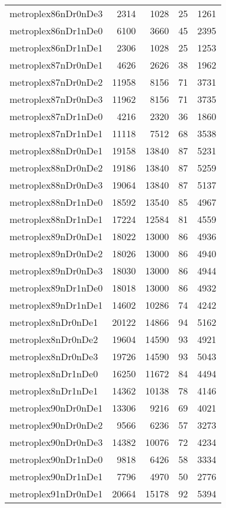 \begin{tabular}{lrrrr}
metroplex86nDr0nDe3 & 2314 & 1028 & 25 & 1261 \\
metroplex86nDr1nDe0 & 6100 & 3660 & 45 & 2395 \\
metroplex86nDr1nDe1 & 2306 & 1028 & 25 & 1253 \\
metroplex87nDr0nDe1 & 4626 & 2626 & 38 & 1962 \\
metroplex87nDr0nDe2 & 11958 & 8156 & 71 & 3731 \\
metroplex87nDr0nDe3 & 11962 & 8156 & 71 & 3735 \\
metroplex87nDr1nDe0 & 4216 & 2320 & 36 & 1860 \\
metroplex87nDr1nDe1 & 11118 & 7512 & 68 & 3538 \\
metroplex88nDr0nDe1 & 19158 & 13840 & 87 & 5231 \\
metroplex88nDr0nDe2 & 19186 & 13840 & 87 & 5259 \\
metroplex88nDr0nDe3 & 19064 & 13840 & 87 & 5137 \\
metroplex88nDr1nDe0 & 18592 & 13540 & 85 & 4967 \\
metroplex88nDr1nDe1 & 17224 & 12584 & 81 & 4559 \\
metroplex89nDr0nDe1 & 18022 & 13000 & 86 & 4936 \\
metroplex89nDr0nDe2 & 18026 & 13000 & 86 & 4940 \\
metroplex89nDr0nDe3 & 18030 & 13000 & 86 & 4944 \\
metroplex89nDr1nDe0 & 18018 & 13000 & 86 & 4932 \\
metroplex89nDr1nDe1 & 14602 & 10286 & 74 & 4242 \\
metroplex8nDr0nDe1 & 20122 & 14866 & 94 & 5162 \\
metroplex8nDr0nDe2 & 19604 & 14590 & 93 & 4921 \\
metroplex8nDr0nDe3 & 19726 & 14590 & 93 & 5043 \\
metroplex8nDr1nDe0 & 16250 & 11672 & 84 & 4494 \\
metroplex8nDr1nDe1 & 14362 & 10138 & 78 & 4146 \\
metroplex90nDr0nDe1 & 13306 & 9216 & 69 & 4021 \\
metroplex90nDr0nDe2 & 9566 & 6236 & 57 & 3273 \\
metroplex90nDr0nDe3 & 14382 & 10076 & 72 & 4234 \\
metroplex90nDr1nDe0 & 9818 & 6426 & 58 & 3334 \\
metroplex90nDr1nDe1 & 7796 & 4970 & 50 & 2776 \\
metroplex91nDr0nDe1 & 20664 & 15178 & 92 & 5394 \\

\end{tabular}
